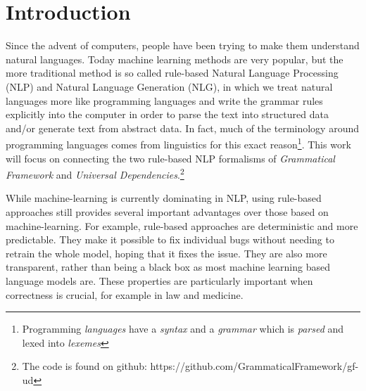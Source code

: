 \chapter{Introduction}

\newcommand{\note}[1]{\todo{#1}}


Since the advent of computers, people have been trying to make them understand natural languages. Today machine learning methods are very popular, but the more traditional method is so called rule-based Natural Language Processing (NLP) and Natural Language Generation (NLG), in which we treat natural languages more like programming languages and write the grammar rules explicitly into the computer in order to parse the text into structured data and/or generate text from abstract data.\cite{chomsky-1957,lambek-1958,curry1961some}
In fact, much of the terminology around programming languages comes from linguistics for this exact reason\footnote{Programming \emph{languages} have a \emph{syntax} and a \emph{grammar} which is \emph{parsed} and lexed into \emph{lexemes}}. This work will focus on connecting the two rule-based NLP formalisms of \emph{Grammatical Framework}\cite{ranta-2011} and \emph{Universal Dependencies}\cite{nivre-etal-2016-universal}.\footnote{The code is found on github: https://github.com/GrammaticalFramework/gf-ud}


While machine-learning is currently dominating in NLP, using rule-based approaches still provides several important advantages over those based on machine-learning.
For example, rule-based approaches are deterministic and more predictable. They make it possible to fix individual bugs without needing to retrain the whole model, hoping that it fixes the issue. They are also more transparent, rather than being a black box as most machine learning based language models are. %
These properties are particularly important when correctness is crucial, for example in law and medicine.



